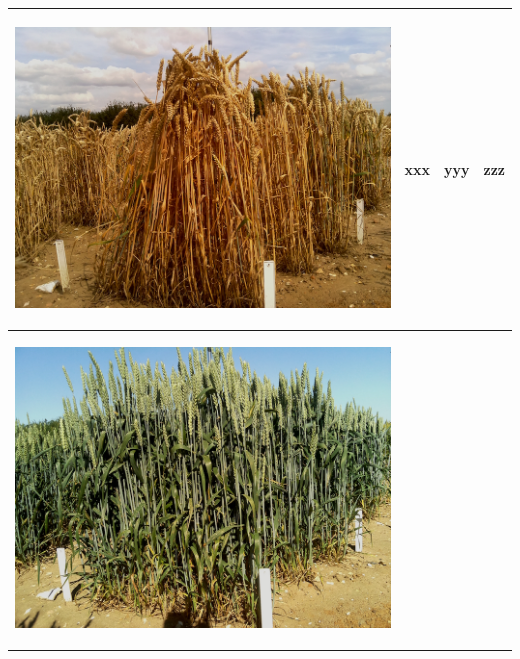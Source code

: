 \begin{table}[h!]
\begin{tabular}{ | c | c | c | c |}
\begin{minipage}{.3\textwidth}
\begin{center}
		\includegraphics[width=\linewidth]{Images/004}
      \end{center}
    \end{minipage}
    &
      xxx
    & 
      yyy
    & 
      zzz
    \\ \hline
    \begin{minipage}{.3\textwidth}
      \begin{center}
		\includegraphics[width=\linewidth]{Images/005}

\end{center}
\end{minipage}
\end{tabular}
\end{table}
